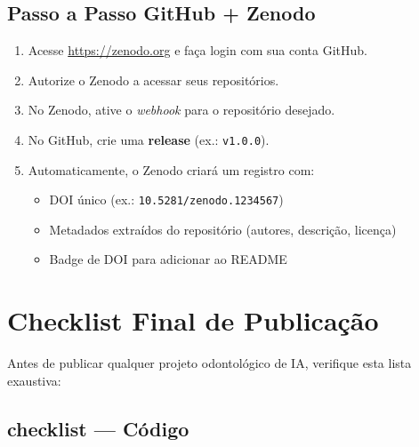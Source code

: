 \subsection{Passo a Passo GitHub + Zenodo}

\begin{enumerate}
  \item Acesse \url{https://zenodo.org} e faça login com sua conta GitHub.
  \item Autorize o Zenodo a acessar seus repositórios.
  \item No Zenodo, ative o \textit{webhook} para o repositório desejado.
  \item No GitHub, crie uma \textbf{release} (ex.: \texttt{v1.0.0}).
  \item Automaticamente, o Zenodo criará um registro com:
    \begin{itemize}
      \item DOI único (ex.: \texttt{10.5281/zenodo.1234567})
      \item Metadados extraídos do repositório (autores, descrição, licença)
      \item Badge de DOI para adicionar ao README
    \end{itemize}
\end{enumerate}


\section{Checklist Final de Publicação}

Antes de publicar qualquer projeto odontológico de IA, verifique esta
lista exaustiva:

\subsection{ checklist — Código}


